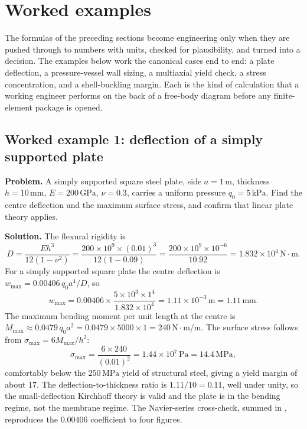 \section{Worked examples}

The formulas of the preceding sections become engineering only when
they are pushed through to numbers with units, checked for plausibility,
and turned into a decision. The examples below work the canonical cases
end to end: a plate deflection, a pressure-vessel wall sizing, a
multiaxial yield check, a stress concentration, and a shell-buckling
margin. Each is the kind of calculation that a working engineer
performs on the back of a free-body diagram before any finite-element
package is opened.

\subsection*{Worked example 1: deflection of a simply supported plate}

\textbf{Problem.} A simply supported square steel plate, side
$a = 1\,\si{\meter}$, thickness $h = 10\,\si{\milli\meter}$, $E =
200\,\text{GPa}$, $\nu = 0.3$, carries a uniform pressure $q_0 =
5\,\text{kPa}$. Find the centre deflection and the maximum surface
stress, and confirm that linear plate theory applies.

\textbf{Solution.} The flexural rigidity is
\[
D = \frac{E h^3}{12(1-\nu^2)} = \frac{200\times 10^9 \times (0.01)^3}
{12(1-0.09)} = \frac{200\times 10^9 \times 10^{-6}}{10.92}
= 1.832\times 10^4\,\text{N}\cdot\text{m}.
\]
For a simply supported square plate the centre deflection is
$w_{\max} = 0.00406\, q_0 a^4/D$, so
\[
w_{\max} = 0.00406 \times \frac{5\times 10^3 \times 1^4}
{1.832\times 10^4} = 1.11\times 10^{-3}\,\text{m} = 1.11\,\si{\milli\meter}.
\]
The maximum bending moment per unit length at the centre is
$M_{\max} \approx 0.0479\, q_0 a^2 = 0.0479\times 5000\times 1 =
240\,\text{N}\cdot\text{m}/\text{m}$. The surface stress follows from
$\sigma_{\max} = 6M_{\max}/h^2$:
\[
\sigma_{\max} = \frac{6\times 240}{(0.01)^2} = 1.44\times 10^7\,
\text{Pa} = 14.4\,\text{MPa},
\]
comfortably below the $250\,\text{MPa}$ yield of structural steel,
giving a yield margin of about $17$. The deflection-to-thickness ratio
is $1.11/10 = 0.11$, well under unity, so the small-deflection
Kirchhoff theory is valid and the plate is in the bending regime, not
the membrane regime. The Navier-series cross-check, summed in
, reproduces the $0.00406$ coefficient
to four figures.

